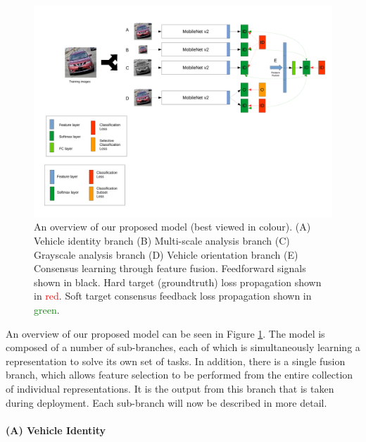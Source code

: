 \documentclass[10pt,twocolumn,letterpaper]{article}
\begin{document}
\begin{figure}
  \includegraphics[width=\linewidth,trim=0cm 8cm 0cm 0cm,clip=true]{images/system_overview_orient_only.pdf}
  \caption{An overview of our proposed model (best viewed in colour). (A) Vehicle identity branch (B) Multi-scale analysis branch (C) Grayscale analysis branch (D) Vehicle orientation branch
(E) Consensus learning through feature fusion. Feedforward signals shown in black. Hard target (groundtruth) loss propagation shown in \textcolor{red}{red}. Soft target consensus feedback loss propagation shown in \textcolor{green}{green}.}
  \label{F:overview}
\end{figure}

An overview of our proposed model can be seen in Figure \ref{F:overview}. The model is composed of a number of sub-branches, each of which is simultaneously learning a representation to solve its own set of tasks. In addition, there is a single fusion branch, which allows feature selection to be performed from the entire collection of individual representations. It is the output from this branch that is taken during deployment. Each sub-branch will now be described in more detail.

\paragraph{(A) Vehicle Identity}
\end{document}

